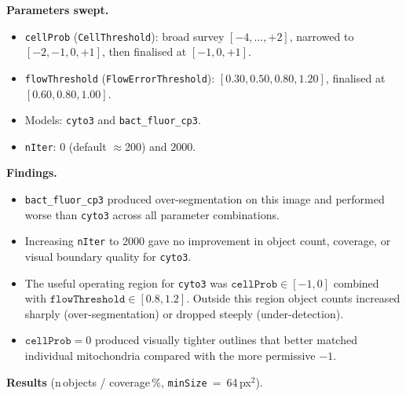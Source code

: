 \documentclass[a4paper, justified]{tufte-book}
\begin{document}
\medskip
\noindent\textbf{Parameters swept.}
\begin{itemize}
  \item \texttt{cellProb} (\texttt{CellThreshold}): broad survey
        $[-4, \ldots, +2]$, narrowed to $[-2, -1, 0, +1]$, then
        finalised at $[-1, 0, +1]$.
  \item \texttt{flowThreshold} (\texttt{FlowErrorThreshold}): $[0.30,
        0.50, 0.80, 1.20]$, finalised at $[0.60, 0.80, 1.00]$.
  \item Models: \texttt{cyto3} and \texttt{bact\_fluor\_cp3}.
  \item \texttt{nIter}: $0$ (default $\approx$200) and $2000$.
\end{itemize}

\noindent\textbf{Findings.}
\begin{itemize}
  \item \texttt{bact\_fluor\_cp3} produced over-segmentation on this
        image and performed worse than \texttt{cyto3} across all
        parameter combinations.
  \item Increasing \texttt{nIter} to 2000 gave no improvement in object
        count, coverage, or visual boundary quality for
        \texttt{cyto3}.
  \item The useful operating region for \texttt{cyto3} was
        $\mathtt{cellProb} \in [-1, 0]$ combined with
        $\mathtt{flowThreshold} \in [0.8, 1.2]$.  Outside this region
        object counts increased sharply (over-segmentation) or dropped
        steeply (under-detection).
  \item $\mathtt{cellProb} = 0$ produced visually tighter outlines that
        better matched individual mitochondria compared with the more
        permissive $-1$.
\end{itemize}

\noindent\textbf{Results} (n\,objects / coverage\,\%, \texttt{minSize}~=~64\,px$^2$).

\end{document}
